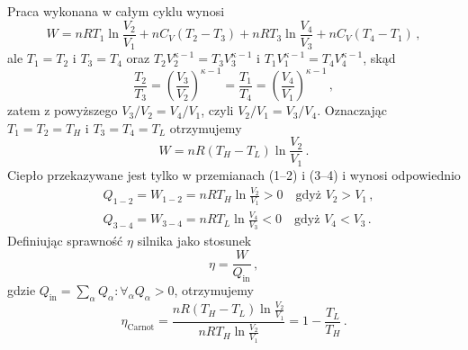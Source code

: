 \documentclass[../main.tex]{subfiles}
\begin{document}
\noindent Praca wykonana w całym cyklu wynosi
\begin{equation*}
    W=nRT_1\ln\frac{V_2}{V_1}+nC_V(T_2-T_3)+nRT_3\ln\frac{V_4}{V_3}+nC_V(T_4-T_1)\,,
\end{equation*}
ale \(T_1=T_2\) i \(T_3=T_4\) oraz \(T_2V_2^{\kappa -1}=T_3V_3^{\kappa-1}\) i \(T_1V_1^{\kappa-1}=T_4V_4^{\kappa-1}\), skąd
\begin{equation*}
    \frac{T_2}{T_3}=\left(\frac{V_3}{V_2}\right)^{\kappa-1}=\frac{T_1}{T_4}=\left(\frac{V_4}{V_1}\right)^{\kappa-1}\,,
\end{equation*}
zatem z powyższego \(V_3/V_2=V_4/V_1\), czyli \(V_2/V_1=V_3/V_4\). Oznaczając \(T_1=T_2=T_H\) i \(T_3=T_4=T_L\) otrzymujemy
\begin{equation*}
    W=nR(T_H-T_L)\ln\frac{V_2}{V_1}\,.
\end{equation*}
Ciepło przekazywane jest tylko w przemianach (1--2) i (3--4) i wynosi odpowiednio
\begin{equation*}
\begin{split}
    &Q_{1-2}=W_{1-2}=nRT_H\ln\frac{V_2}{V_1}>0\quad\text{gdyż \(V_2>V_1\)}\,,\\
    &Q_{3-4}=W_{3-4}=nRT_L\ln\frac{V_4}{V_3}<0\quad\text{gdyż \(V_4<V_3\)}\,.
\end{split}
\end{equation*}
Definiując sprawność \(\eta\) silnika jako stosunek
\begin{equation*}
    \eta=\frac{W}{Q_\text{in}}\,,
\end{equation*}
gdzie \(Q_\text{in}=\sum_\alpha Q_\alpha : \forall_\alpha Q_\alpha >0\), otrzymujemy
\begin{equation*}
    \eta_\text{Carnot}=\frac{nR(T_H-T_L)\ln\frac{V_2}{V_1}}{nRT_H\ln\frac{V_2}{V_1}}=1-\frac{T_L}{T_H}\,.
\end{equation*}
\noindent{}
\medskip
\end{document}

